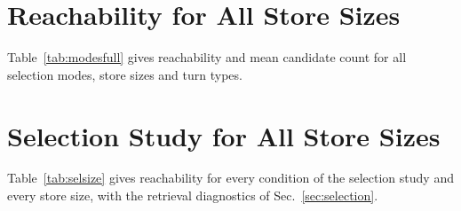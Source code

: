 \IfFileExists{IEEEtran.cls}{\documentclass[journal]{IEEEtran}\def\HAVEIEEE{1}}{\documentclass[10pt,twocolumn]{article}\usepackage[margin=0.7in,columnsep=0.25in]{geometry}}
\begin{document}
\begin{table}[!ht]
\centering\footnotesize
\caption{Ablation, auto-apply policy: error-rate cells (60 paired persona runs each). * : uncorrected $p<0.05$.}
\label{tab:appauto}
\end{table}

\FloatBarrier
\section{Reachability for All Store Sizes}
Table~\ref{tab:modesfull} gives reachability and mean candidate count for all selection modes, store sizes and turn types.

\begin{table}[!ht]
\centering\footnotesize
\caption{Reachability (mean number of candidates) by mode, store size $N$ and turn type.}
\label{tab:modesfull}
\end{table}

\FloatBarrier
\section{Selection Study for All Store Sizes}
Table~\ref{tab:selsize} gives reachability for every condition of the selection study and every store size, with the retrieval diagnostics of Sec.~\ref{sec:selection}.

\begin{table}[!ht]
\centering\footnotesize
\caption{Selection study: reachability by condition and store size $N$, and diagnostics (\selEventsTotal\ change events per store size).}
\label{tab:selsize}
\end{table}

\FloatBarrier
\end{document}
